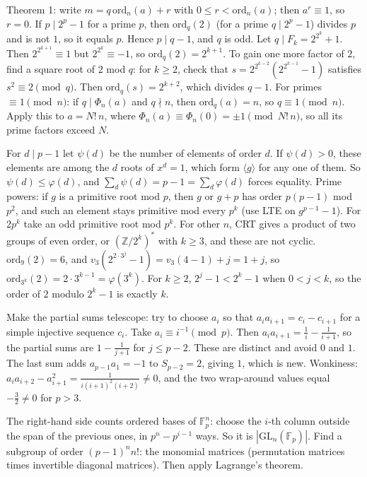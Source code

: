 \documentclass[11pt,a4paper]{article}
\begin{document}

 Theorem 1: write $m=q\,\mathrm{ord}_n(a)+r$ with $0\le r<\mathrm{ord}_n(a)$; then $a^r\equiv1$, so $r=0$. If $p\mid 2^p-1$ for a prime $p$, then $\mathrm{ord}_q(2)$ (for a prime $q\mid 2^p-1$) divides $p$ and is not $1$, so it equals $p$. Hence $p\mid q-1$, and $q$ is odd.
 Let $q\mid F_k=2^{2^k}+1$. Then $2^{2^{k+1}}\equiv1$ but $2^{2^k}\equiv-1$, so $\mathrm{ord}_q(2)=2^{k+1}$. To gain one more factor of $2$, find a square root of $2$ mod $q$: for $k\ge2$, check that $s=2^{2^{k-2}}(2^{2^{k-1}}-1)$ satisfies $s^2\equiv2\pmod q$.
 Then $\mathrm{ord}_q(s)=2^{k+2}$, which divides $q-1$. For primes $\equiv1\pmod n$: if $q\mid\Phi_n(a)$ and $q\nmid n$, then $\mathrm{ord}_q(a)=n$, so $q\equiv1\pmod n$. Apply this to $a=N!\,n$, where $\Phi_n(a)\equiv\Phi_n(0)=\pm1\pmod{N!\,n}$, so all its prime factors exceed $N$.

 For $d\mid p-1$ let $\psi(d)$ be the number of elements of order $d$. If $\psi(d)>0$, these elements are among the $d$ roots of $x^d=1$, which form $\langle g\rangle$ for any one of them. So $\psi(d)\le\varphi(d)$, and $\sum_d\psi(d)=p-1=\sum_d\varphi(d)$ forces equality.
 Prime powers: if $g$ is a primitive root mod $p$, then $g$ or $g+p$ has order $p(p-1)$ mod $p^2$, and such an element stays primitive mod every $p^k$ (use LTE on $g^{p-1}-1$). For $2p^k$ take an odd primitive root mod $p^k$. For other $n$, CRT gives a product of two groups of even order, or $(\mathbb Z/2^k)^*$ with $k\ge3$, and these are not cyclic.
 $\mathrm{ord}_9(2)=6$, and $v_3(2^{2\cdot3^j}-1)=v_3(4-1)+j=1+j$, so $\mathrm{ord}_{3^k}(2)=2\cdot3^{k-1}=\varphi(3^k)$. For $k\ge2$, $2^j-1<2^k-1$ when $0<j<k$, so the order of $2$ modulo $2^k-1$ is exactly $k$.

 Make the partial sums telescope: try to choose $a_i$ so that $a_ia_{i+1}=c_i-c_{i+1}$ for a simple injective sequence $c_i$.
 Take $a_i\equiv i^{-1}\pmod p$. Then $a_ia_{i+1}=\frac1i-\frac1{i+1}$, so the partial sums are $1-\frac1{j+1}$ for $j\le p-2$. These are distinct and avoid $0$ and $1$.
 The last sum adds $a_{p-1}a_1=-1$ to $S_{p-2}=2$, giving $1$, which is new. Wonkiness: $a_ia_{i+2}-a_{i+1}^2=\frac{1}{i(i+1)^2(i+2)}\neq0$, and the two wrap-around values equal $-\frac32\ne0$ for $p>3$.

 The right-hand side counts ordered bases of $\mathbb F_p^n$: choose the $i$-th column outside the span of the previous ones, in $p^n-p^{i-1}$ ways. So it is $|\mathrm{GL}_n(\mathbb F_p)|$.
 Find a subgroup of order $(p-1)^nn!$: the monomial matrices (permutation matrices times invertible diagonal matrices). Then apply Lagrange's theorem.
\end{document}
